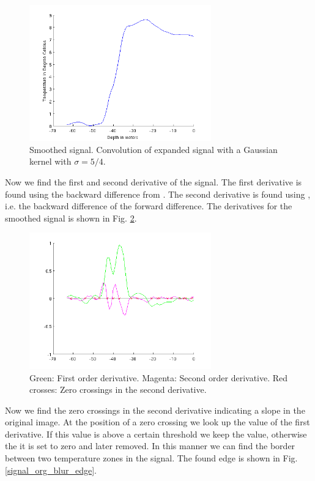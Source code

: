 \documentclass[a4paper, 10pt, final]{article}
\begin{document}
\begin{figure}[!h]
    \centering
    \includegraphics[angle=0,width=0.7\textwidth]{images/blur_signal}
    \caption[]{Smoothed signal. Convolution of expanded signal with a
    Gaussian kernel with $\sigma = 5/4$.}
    \label{blur_signal}
\end{figure}

Now we find the first and second derivative of the signal. The first
derivative is found using the backward difference from \citep[Eq.
(12.29)]{jahne-digital}. The second derivative is found using
\citep[Eq. (12.44)]{jahne-digital}, i.e. the backward difference of the
forward difference. The derivatives for the smoothed signal is shown in
Fig. \ref{derivatives}.

\begin{figure}[!h]
    \centering
    \includegraphics[angle=0,width=0.7\textwidth]{images/derivatives}
    \caption[]{Green: First order derivative. Magenta: Second order
    derivative. Red crosses: Zero crossings in the second derivative.}
    \label{derivatives}
\end{figure}

Now we find the zero crossings in the second derivative indicating a
slope in the original image. At the position of a zero crossing we look
up the value of the first derivative. If this value is above a certain
threshold we keep the value, otherwise the it is set to zero and later
removed. In this manner we can find the border between two temperature
zones in the signal. The found edge is shown in Fig.
\ref{signal_org_blur_edge}.
\end{document}
